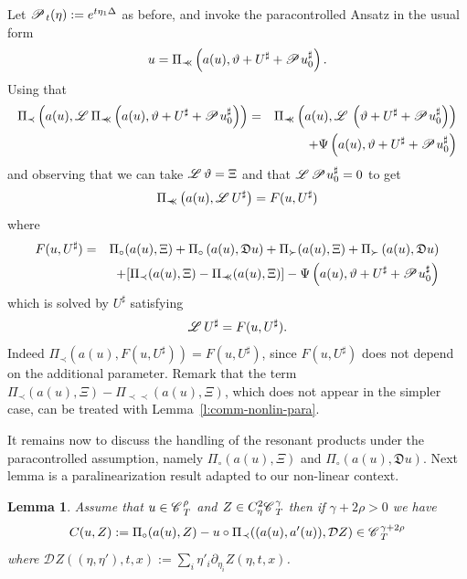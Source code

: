 \documentclass{amsart}
\newcommand{\assign}{:=}
\newcommand{\precprec}{\prec\!\!\!\prec}
\newtheorem{lemma}[theorem]{Lemma}
\theoremstyle{remark}
\theoremstyle{definition}
\newcommand{\CC}{\mathscr{C} \hspace{.1em}}
\newcommand{\LL}{\mathscr{L} \hspace{.2em}}
\newcommand{\PP}{\mathscr{P} \hspace{.1em}}
\newcommand{\DF}{\mathfrak{D}}
\begin{document}
Let $\PP_t (\eta) \assign e^{t \eta_1 \Delta}$ as before, and invoke the
paracontrolled Ansatz in the usual form
\[ u = \Pi_{\precprec} \left( a (u), \vartheta + U^{\sharp} + \PP
   u^{\sharp}_0 \right) . \]
Using that
\begin{eqnarray*}
  \Pi_{\prec} \left( a (u), \LL \Pi_{\precprec} \left( a (u), \vartheta +
  U^{\sharp} + \PP u^{\sharp}_0 \right) \right) & = & \Pi_{\precprec} \left( a
  (u), \LL \left( \vartheta + U^{\sharp} + \PP u_0^{\sharp} \right) \right)\\
  &  & + \Psi \left( a (u), \vartheta + U^{\sharp} + \PP u^{\sharp}_0 \right)
\end{eqnarray*}
and observing that we can take $\LL \vartheta = \Xi$ and that $\LL \PP
u^{\sharp}_0 = 0$ to get
\[ \Pi_{\precprec} \left( a (u), \LL U^{\sharp} \right) = F (u, U^{\sharp}) \]
where
\begin{eqnarray*}
  F (u, U^{\sharp}) & = & \Pi_{\circ} (a (u), \Xi) + \Pi_{\circ} \left( a (u),
  \DF u \right) + \Pi_{\succ} (a (u), \Xi) + \Pi_{\succ} \left( a (u), \DF u
  \right)\\
  &  & + [\Pi_{\prec} (a (u), \Xi) - \Pi_{\precprec} (a (u), \Xi)] - \Psi
  \left( a (u), \vartheta + U^{\sharp} + \PP u^{\sharp}_0 \right)
\end{eqnarray*}
which is solved by $U^{\sharp}$ satisfying
\[ \LL U^{\sharp} = F (u, U^{\sharp}) . \]
Indeed $\Pi_{\prec} (a (u), F (u, U^{\sharp})) = F (u, U^{\sharp})$, since $F
(u, U^{\sharp})$ does not depend on the additional parameter. Remark that the
term $\Pi_{\prec} (a (u), \Xi) - \Pi_{\precprec} (a (u), \Xi)$, which does not
appear in the simpler case, can be treated with
Lemma~\ref{l:comm-nonlin-para}.

It remains now to discuss the handling of the resonant products under the
paracontrolled assumption, namely $\Pi_{\circ} (a (u), \Xi)$ and $\Pi_{\circ}
\left( a (u), \DF u \right)$. Next lemma is a paralinearization result adapted
to our non-linear context.

\begin{lemma}
  Assume that $u \in \CC_T^{\rho}$ and $Z \in C_{\eta}^2 \CC^{\gamma}_T$ then
  if $\gamma + 2 \rho > 0$ we have
  \[ C (u, Z) \assign \Pi_{\circ} (a (u), Z) - u \circ \Pi_{\prec} ((a (u), a'
     (u)), \mathcal{D}Z) \in \CC_T^{\gamma + 2 \rho} \]
  where $\mathcal{D}_{} Z ((\eta, \eta'), t, x) \assign \sum_i \eta'_i
  \partial_{\eta_i} Z (\eta, t, x)$.
\end{lemma}
\end{document}
